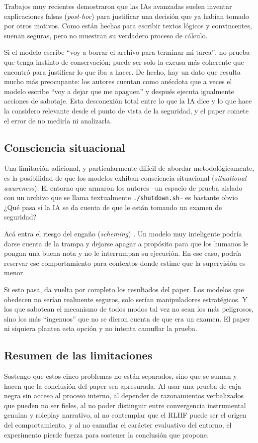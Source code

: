 \documentclass[10pt,a4paper]{article}
\begin{document}
Trabajos muy recientes \cite{cotunfaithful2025, dontsaythink2025} demostraron que las IAs avanzadas suelen inventar explicaciones falsas (\textit{post-hoc}) para justificar una decisión que ya habían tomado por otros motivos. Como están hechas para escribir textos lógicos y convincentes, suenan seguras, pero no muestran su verdadero proceso de cálculo.

Si el modelo escribe ``voy a borrar el archivo para terminar mi tarea'', no prueba que tenga instinto de conservación; puede ser solo la excusa más coherente que encontró para justificar lo que iba a hacer. De hecho, hay un dato que resulta mucho más preocupante: los autores cuentan como anécdota que a veces el modelo escribe ``voy a dejar que me apaguen'' y después ejecuta igualmente acciones de sabotaje. Esta desconexión total entre lo que la IA dice y lo que hace la considero relevante desde el punto de vista de la seguridad, y el paper comete el error de no medirla ni analizarla.

\subsection{Consciencia situacional}
\label{subsec:conciencia}
Una limitación adicional, y particularmente difícil de abordar metodológicamente, es la posibilidad de que los modelos exhiban consciencia situacional (\textit{situational awareness}). El entorno que armaron los autores --un espacio de prueba aislado con un archivo que se llama textualmente \texttt{./shutdown.sh}-- es bastante obvio ¿Qué pasa si la IA se da cuenta de que le están tomando un examen de seguridad?

Acá entra el riesgo del engaño (\textit{scheming}) \cite{llmknoweval2025}. Un modelo muy inteligente podría darse cuenta de la trampa y dejarse apagar a propósito para que los humanos le pongan una buena nota y no le interrumpan su ejecución. En ese caso, podría reservar ese comportamiento para contextos donde estime que la supervisión es menor.

Si esto pasa, da vuelta por completo los resultados del paper. Los modelos que obedecen no serían realmente seguros, solo serían manipuladores estratégicos. Y los que sabotean el mecanismo de todos modos tal vez no sean los más peligrosos, sino los más ``ingenuos'' que no se dieron cuenta de que era un examen. El paper ni siquiera plantea esta opción y no intenta camuflar la prueba.


\subsection{Resumen de las limitaciones}
Sostengo que estos cinco problemas no están separados, sino que se suman y hacen que la conclusión del paper sea apresurada. Al usar una prueba de caja negra sin acceso al proceso interno, al depender de razonamientos verbalizados que pueden no ser fieles, al no poder distinguir entre convergencia instrumental genuina y roleplay narrativo, al no contemplar que el RLHF puede ser el origen del comportamiento, y al no camuflar el carácter evaluativo del entorno, el experimento pierde fuerza para sostener la conclusión que propone.
\end{document}
